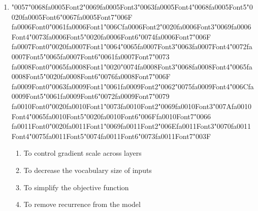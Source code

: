 \documentclass[12pt]{article}
\begin{document}
\begin{enumerate}[label=Q\arabic*.]
 \begin{enumerate}[label=(\Alph*)]
     \item The documents are strongly unrelated in topic
     \item They have negatively correlated term weights
     \item The similarity computation was implemented incorrectly
     \item The documents share no terms
 \end{enumerate}
 
 \item {\char"0057}{\char"0068}{\csname fa0005Font2\endcsname\char"0069}{\csname fa0005Font3\endcsname\char"0063}{\csname fa0005Font4\endcsname\char"0068}{\csname fa0005Font5\endcsname\char"0020}{\csname fa0005Font6\endcsname\char"0067}{\csname fa0005Font7\endcsname\char"006F} {\csname fa0006Font0\endcsname\char"0061}{\csname fa0006Font1\endcsname\char"006C}{\csname fa0006Font2\endcsname\char"0020}{\csname fa0006Font3\endcsname\char"0069}{\csname fa0006Font4\endcsname\char"0073}{\csname fa0006Font5\endcsname\char"0020}{\csname fa0006Font6\endcsname\char"0074}{\csname fa0006Font7\endcsname\char"006F} {\csname fa0007Font0\endcsname\char"0020}{\csname fa0007Font1\endcsname\char"0064}{\char"0065}{\csname fa0007Font3\endcsname\char"0063}{\csname fa0007Font4\endcsname\char"0072}{\csname fa0007Font5\endcsname\char"0065}{\csname fa0007Font6\endcsname\char"0061}{\csname fa0007Font7\endcsname\char"0073} {\csname fa0008Font0\endcsname\char"0065}{\csname fa0008Font1\endcsname\char"0020}{\char"0074}{\csname fa0008Font3\endcsname\char"0068}{\csname fa0008Font4\endcsname\char"0065}{\csname fa0008Font5\endcsname\char"0020}{\csname fa0008Font6\endcsname\char"0076}{\csname fa0008Font7\endcsname\char"006F} {\csname fa0009Font0\endcsname\char"0063}{\csname fa0009Font1\endcsname\char"0061}{\csname fa0009Font2\endcsname\char"0062}{\char"0075}{\csname fa0009Font4\endcsname\char"006C}{\csname fa0009Font5\endcsname\char"0061}{\csname fa0009Font6\endcsname\char"0072}{\csname fa0009Font7\endcsname\char"0079} {\csname fa0010Font0\endcsname\char"0020}{\csname fa0010Font1\endcsname\char"0073}{\csname fa0010Font2\endcsname\char"0069}{\csname fa0010Font3\endcsname\char"007A}{\csname fa0010Font4\endcsname\char"0065}{\csname fa0010Font5\endcsname\char"0020}{\csname fa0010Font6\endcsname\char"006F}{\csname fa0010Font7\endcsname\char"0066} {\csname fa0011Font0\endcsname\char"0020}{\csname fa0011Font1\endcsname\char"0069}{\csname fa0011Font2\endcsname\char"006E}{\csname fa0011Font3\endcsname\char"0070}{\csname fa0011Font4\endcsname\char"0075}{\csname fa0011Font5\endcsname\char"0074}{\csname fa0011Font6\endcsname\char"0073}{\csname fa0011Font7\endcsname\char"003F}
 \begin{enumerate}[label=(\Alph*)]
     \item To control gradient scale across layers
     \item To decrease the vocabulary size of inputs
     \item To simplify the objective function
     \item To remove recurrence from the model
 \end{enumerate}
 

\end{enumerate}
\end{document}
